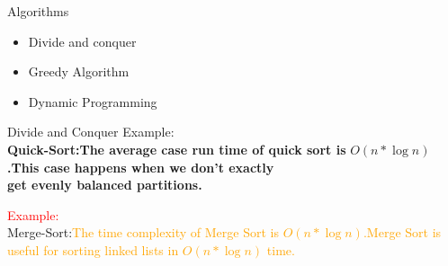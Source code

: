 \documentclass{beamer}[10pt]
\begin{document}
\begin{frame}{Algorithms}
\label{Algorithms}
\begin{itemize}
    \item Divide and conquer \pause
    \item Greedy Algorithm \pause
    \item Dynamic Programming 
\end{itemize}
    
\end{frame}

\begin{frame}{Divide and Conquer}
{Example:\\
\textbf{Quick-Sort:The average case run time of quick sort is} $O(n*\log n)$\textbf{.This case happens when we don't exactly \\ get evenly balanced partitions.}}

{\textcolor{red}{Example:} \\
Merge-Sort:\textcolor{orange}{The time complexity of Merge Sort is $O(n*\log n)$.Merge Sort is useful for sorting linked lists in $O(n*\log n)$ time.}}
    
\end{frame}
\end{document}

